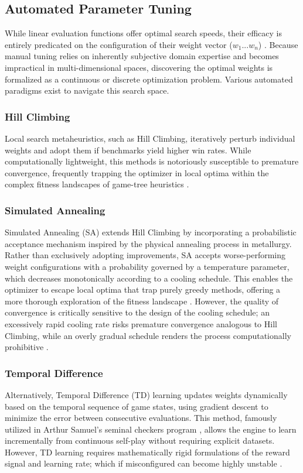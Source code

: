 \subsection{Automated Parameter Tuning}
While linear evaluation functions offer optimal search speeds, their efficacy is entirely predicated on the configuration of their weight vector ($w_1 ... w_n$) \cite{shannon1950programming}. Because manual tuning relies on inherently subjective domain expertise and becomes impractical in multi-dimensional spaces, discovering the optimal weights is formalized as a continuous or discrete optimization problem. Various automated paradigms exist to navigate this search space.

\subsubsection{Hill Climbing}
Local search metaheuristics, such as Hill Climbing, iteratively perturb individual weights and adopt them if benchmarks yield higher win rates. While computationally lightweight, this methods is notoriously susceptible to premature convergence, frequently trapping the optimizer in local optima within the complex fitness landscapes of game-tree heuristics \cite{Artificial_intelligence, brange2021evaluating}.

\subsubsection{Simulated Annealing}
Simulated Annealing (SA) \cite{kirkpatrick1983optimization} extends Hill Climbing by incorporating a probabilistic acceptance mechanism inspired by the physical annealing process in metallurgy. Rather than exclusively adopting improvements, SA accepts worse-performing weight configurations with a probability governed by a temperature parameter, which decreases monotonically according to a cooling schedule. This enables the optimizer to escape local optima that trap purely greedy methods, offering a more thorough exploration of the fitness landscape \cite{Artificial_intelligence}. However, the quality of convergence is critically sensitive to the design of the cooling schedule; an excessively rapid cooling rate risks premature convergence analogous to Hill Climbing, while an overly gradual schedule renders the process computationally prohibitive \cite{kirkpatrick1983optimization}.

\subsubsection{Temporal Difference}
Alternatively, Temporal Difference (TD) learning updates weights dynamically based on the temporal sequence of game states, using gradient descent to minimize the error between consecutive evaluations. This method, famously utilized in Arthur Samuel's seminal checkers program \cite{samuel1959some}, allows the engine to learn incrementally from continuous self-play without requiring explicit datasets. However, TD learning requires mathematically rigid formulations of the reward signal and learning rate; which if misconfigured can become highly unstable \cite{silver2018general}.

